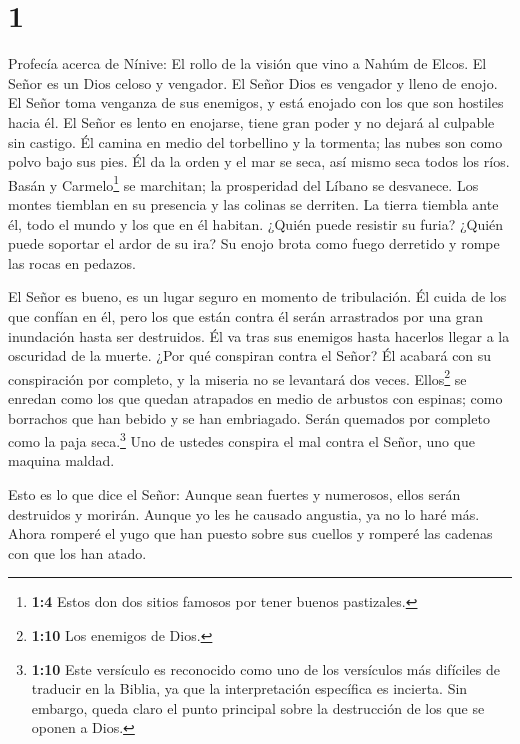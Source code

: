 \hypertarget{section}{%
\section{1}\label{section}}

 Profecía acerca de Nínive: El rollo de la visión que vino a
Nahúm de Elcos.  El Señor es un Dios celoso y vengador. El
Señor Dios es vengador y lleno de enojo. El Señor toma venganza de sus
enemigos, y está enojado con los que son hostiles hacia él. 
El Señor es lento en enojarse, tiene gran poder y no dejará al culpable
sin castigo. Él camina en medio del torbellino y la tormenta; las nubes
son como polvo bajo sus pies.  Él da la orden y el mar se
seca, así mismo seca todos los ríos. Basán y Carmelo\footnote{\textbf{1:4}
  Estos don dos sitios famosos por tener buenos pastizales.} se
marchitan; la prosperidad del Líbano se desvanece.  Los
montes tiemblan en su presencia y las colinas se derriten. La tierra
tiembla ante él, todo el mundo y los que en él habitan. 
¿Quién puede resistir su furia? ¿Quién puede soportar el ardor de su
ira? Su enojo brota como fuego derretido y rompe las rocas en pedazos.

 El Señor es bueno, es un lugar seguro en momento de
tribulación. Él cuida de los que confían en él,  pero los
que están contra él serán arrastrados por una gran inundación hasta ser
destruidos. Él va tras sus enemigos hasta hacerlos llegar a la oscuridad
de la muerte.  ¿Por qué conspiran contra el Señor? Él
acabará con su conspiración por completo, y la miseria no se levantará
dos veces.  Ellos\footnote{\textbf{1:10} Los enemigos de
  Dios.} se enredan como los que quedan atrapados en medio de arbustos
con espinas; como borrachos que han bebido y se han embriagado. Serán
quemados por completo como la paja seca.\footnote{\textbf{1:10} Este
  versículo es reconocido como uno de los versículos más difíciles de
  traducir en la Biblia, ya que la interpretación específica es
  incierta. Sin embargo, queda claro el punto principal sobre la
  destrucción de los que se oponen a Dios.}  Uno de ustedes
conspira el mal contra el Señor, uno que maquina maldad.

 Esto es lo que dice el Señor: Aunque sean fuertes y
numerosos, ellos serán destruidos y morirán. Aunque yo les he causado
angustia, ya no lo haré más.  Ahora romperé el yugo que han
puesto sobre sus cuellos y romperé las cadenas con que los han atado.

